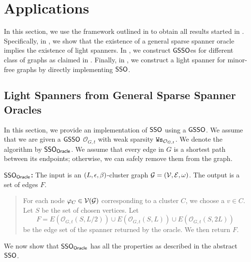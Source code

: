
\section{Applications}\label{sec:app}

In this section, we use the framework outlined in  to obtain all results started in . Specifically, in , we show that the existence of a general sparse spanner oracle implies the existence of light spanners. In , we construct $\mathsf{GSSO}$es for different class of graphs as claimed in . Finally, in , we construct a light spanner for minor-free graphs by directly implementing \hyperlink{SPHigh}{$\mathsf{SSO}$}.

\subsection{Light Spanners from General Sparse Spanner Oracles}\label{subsec:B-Oracle}

In this section, we provide an implementation of \hyperlink{SPHigh}{$\mathsf{SSO}$} using a $\mathsf{GSSO}$. We assume that we are given a $\mathsf{GSSO}$ $\mathcal{O}_{G,t}$ with weak sparsity $\mathtt{Ws}_{\mathcal{O}_{G,t}}$. We denote the algorithm by $\mathsf{SSO}_{\mathsf{Oracle}}$. We assume that every edge in $G$ is a shortest path between its endpoints; otherwise, we can safely remove them from the graph.



\begin{tcolorbox}
	\hypertarget{SPHOracle}{}
	\textbf{$\mathsf{SSO}_{\mathsf{Oracle}}$:} The input is an $(L,\epsilon,\beta)$-cluster graph $\mathcal{G}=(\mathcal{V},\mathcal{E},\omega)$. The output is a set of edges $F$.
	\begin{quote}
		For each node $\varphi_C \in \mathcal{V}(\mathcal{G})$ corresponding to a cluster $C$, we choose a $v \in C$. Let $S$ be the set of chosen vertices. Let 
		\begin{equation} \label{eq:F-oracle}
			F = E(\mathcal{O}_{G,t}(S,L/2))\cup E(\mathcal{O}_{G,t}(S,L))\cup  E(\mathcal{O}_{G,t}(S,2L))
		\end{equation}
		 be the edge set of the spanner returned by the oracle.   We then return $F$.
	\end{quote}
\end{tcolorbox}


We now show that $\mathsf{SSO}_{\mathsf{Oracle}}$ has all the properties as described in the abstract  \hyperlink{SPHigh}{$\mathsf{SSO}$}.

